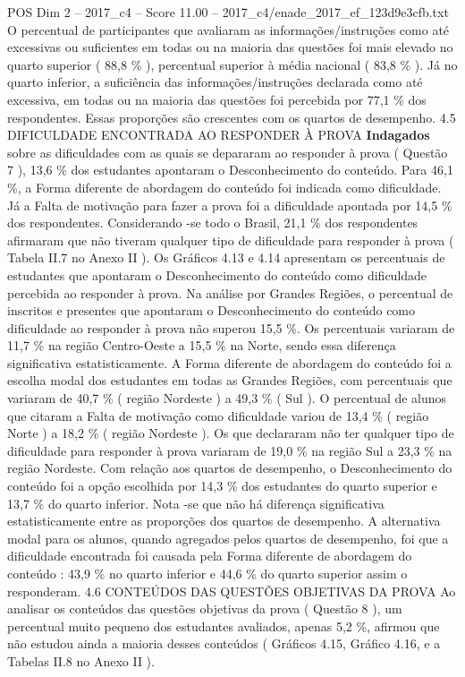 \begin{textsample}{POS Dim 2 – 2017\_c4 – Score 11.00 – 2017\_c4/enade\_2017\_ef\_123d9e3cfb.txt}
O percentual de participantes que avaliaram as informações/instruções como até excessivas ou suficientes em todas ou na maioria das questões foi mais elevado no quarto superior ( 88,8 \% ), percentual superior à média nacional ( 83,8 \% ).
Já no quarto inferior, a suficiência das informações/instruções declarada como até excessiva, em todas ou na maioria das questões foi percebida por 77,1 \% dos respondentes.
Essas proporções são crescentes com os quartos de desempenho. 4.5 DIFICULDADE ENCONTRADA AO RESPONDER À PROVA \textbf{Indagados} sobre as dificuldades com as quais se depararam ao responder à prova ( Questão 7 ), 13,6 \% dos estudantes apontaram o Desconhecimento do conteúdo.
Para 46,1 \%, a Forma diferente de abordagem do conteúdo foi indicada como dificuldade.
Já a Falta de motivação para fazer a prova foi a dificuldade apontada por 14,5 \% dos respondentes.
Considerando -se todo o Brasil, 21,1 \% dos respondentes afirmaram que não tiveram qualquer tipo de dificuldade para responder à prova ( Tabela II.7 no Anexo II ).
Os Gráficos 4.13 e 4.14 apresentam os percentuais de estudantes que apontaram o Desconhecimento do conteúdo como dificuldade percebida ao responder à prova.
Na análise por Grandes Regiões, o percentual de inscritos e presentes que apontaram o Desconhecimento do conteúdo como dificuldade ao responder à prova não superou 15,5 \%.
Os percentuais variaram de 11,7 \% na região Centro-Oeste a 15,5 \% na Norte, sendo essa diferença significativa estatisticamente.
A Forma diferente de abordagem do conteúdo foi a escolha modal dos estudantes em todas as Grandes Regiões, com percentuais que variaram de 40,7 \% ( região Nordeste ) a 49,3 \% ( Sul ).
O percentual de alunos que citaram a Falta de motivação como dificuldade variou de 13,4 \% ( região Norte ) a 18,2 \% ( região Nordeste ).
Os que declararam não ter qualquer tipo de dificuldade para responder à prova variaram de 19,0 \% na região Sul a 23,3 \% na região Nordeste.
Com relação aos quartos de desempenho, o Desconhecimento do conteúdo foi a opção escolhida por 14,3 \% dos estudantes do quarto superior e 13,7 \% do quarto inferior.
Nota -se que não há diferença significativa estatisticamente entre as proporções dos quartos de desempenho.
A alternativa modal para os alunos, quando agregados pelos quartos de desempenho, foi que a dificuldade encontrada foi causada pela Forma diferente de abordagem do conteúdo : 43,9 \% no quarto inferior e 44,6 \% do quarto superior assim o responderam. 4.6 CONTEÚDOS DAS QUESTÕES OBJETIVAS DA PROVA Ao analisar os conteúdos das questões objetivas da prova ( Questão 8 ), um percentual muito pequeno dos estudantes avaliados, apenas 5,2 \%, afirmou que não estudou ainda a maioria desses conteúdos ( Gráficos 4.15, Gráfico 4.16, e a Tabelas II.8 no Anexo II ).

\end{textsample}
